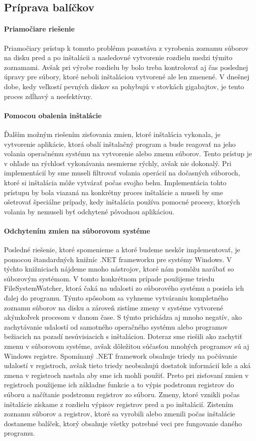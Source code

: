 \subsection{Príprava balíčkov}

\paragraph{Priamočiare riešenie}
Priamočiary prístup k tomuto problému pozostáva z vyrobenia zoznamu súborov na disku pred a po inštalácii a nasledovné vytvorenie rozdielu medzi týmito zoznamami. Avšak pri výrobe rozdielu by bolo treba kontrolovať aj čas poslednej úpravy pre súbory, ktoré neboli inštaláciou vytvorené ale len zmenené. V dnešnej dobe, kedy veľkostí pevných diskov sa pohybujú v stovkách gigabajtov, je tento proces zdĺhavý a neefektívny. 
\paragraph{Pomocou obalenia inštalácie}
Ďalším možným riešením zisťovania zmien, ktoré inštalácia vykonala, je vytvorenie aplikácie, ktorá obalí inštalačný program a bude reagovať na jeho volania operačnému systému na vytvorenie alebo zmenu súborov. Tento prístup je v ohľade na rýchlosť vykonávania nesmierne rýchly, avšak nie dokonalý. Pri implementácií by sme museli filtrovať volania operácií na dočasných súboroch, ktoré si inštalácia môže vytvárať počas svojho behu. Implementácia tohto prístupu by bola viazaná na konkrétny proces inštalácie a museli by sme ošetrovať špeciálne prípady, kedy inštalácia používa pomocné procesy, ktorých volania by nemuseli byť odchytené pôvodnou aplikáciou. 
\paragraph{Odchytením zmien na súborovom systéme}
Posledné riešenie, ktoré spomenieme a ktoré budeme neskôr implementovať, je pomocou štandardných knižníc .NET frameworku pre systémy Windows. V týchto knižniciach nájdeme mnoho nástrojov, ktoré nám pomôžu narábať so súborovým systémom. V tomto konkrétnom prípade použijeme triedu FileSystemWatcher, ktorá čaká na udalosti zo súborového systému a posiela ich ďalej do programu. Týmto spôsobom sa vyhneme vytváraniu kompletného zoznamu súborov na disku a zároveň zistíme zmeny v systéme vytvorené akýmkoľvek procesom v danom čase. S týmto prichádza aj mnoho negatív, ako zachytávanie udalostí od samotného operačného systému alebo programov bežiacich na pozadí nesúvisiacich s inštaláciou. Doteraz sme riešili ako zachytiť zmenu v súborovom systéme, avšak dôležitou súčasťou mnohých programov sú aj Windows registre. Spomínaný .NET framework obsahuje triedy na počúvanie udalostí v registroch, avšak tieto triedy neobsahujú dostatok informácií kde a aká zmena v registroch nastala aby sme ich mohli použiť. Preto pri zisťovaní zmien v registroch použijeme ich základne funkcie a to výpis podstromu  registrov do súboru a načítanie podstromu registrov zo súboru. Zmeny, ktoré vznikli počas inštalácie získame z rozdielu výpisov registrov pred a po inštalácií. Zistením zoznamu súborov a registrov, ktoré sa vyrobili alebo zmenili počas inštalácie dostaneme balíček, ktorý obsahuje všetky potrebné veci pre fungovanie daného programu.


